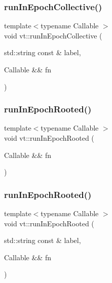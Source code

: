 \subsubsection{\texorpdfstring{run\+In\+Epoch\+Collective()}{runInEpochCollective()}\hspace{0.1cm}{\footnotesize\ttfamily [2/2]}}
{\footnotesize\ttfamily template$<$typename Callable $>$ \\
void vt\+::run\+In\+Epoch\+Collective (\begin{DoxyParamCaption}\item[{std\+::string const \&}]{label,  }\item[{Callable \&\&}]{fn }\end{DoxyParamCaption})}

\mbox{\label{namespacevt_a9f5cbbc484d7f14f2ad0ee46d62dfb6e}} 
\subsubsection{\texorpdfstring{run\+In\+Epoch\+Rooted()}{runInEpochRooted()}\hspace{0.1cm}{\footnotesize\ttfamily [1/2]}}
{\footnotesize\ttfamily template$<$typename Callable $>$ \\
void vt\+::run\+In\+Epoch\+Rooted (\begin{DoxyParamCaption}\item[{Callable \&\&}]{fn }\end{DoxyParamCaption})}

\mbox{\label{namespacevt_af80867582a504d0f3cf4e2d95596645b}} 
\subsubsection{\texorpdfstring{run\+In\+Epoch\+Rooted()}{runInEpochRooted()}\hspace{0.1cm}{\footnotesize\ttfamily [2/2]}}
{\footnotesize\ttfamily template$<$typename Callable $>$ \\
void vt\+::run\+In\+Epoch\+Rooted (\begin{DoxyParamCaption}\item[{std\+::string const \&}]{label,  }\item[{Callable \&\&}]{fn }\end{DoxyParamCaption})}

